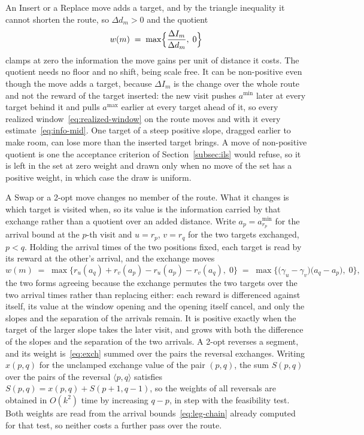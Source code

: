 An Insert or a Replace move adds a target, and by the triangle inequality it cannot shorten the route, so $\Delta d_m > 0$ and the quotient
\begin{equation}\label{eq:cand-weight}
    w(m) \;=\; \max\Bigl\{ \frac{\Delta I_m}{\Delta d_m},\; 0 \Bigr\}
\end{equation}
clamps at zero the information the move gains per unit of distance it costs. The quotient needs no floor and no shift, being scale free.
It can be non-positive even though the move adds a target, because $\Delta I_m$ is the change over
the whole route and not the reward of the target inserted: the new visit pushes $a^{\min}$ later
at every target behind it and pulls $a^{\max}$ earlier at every target ahead of it, so every realized
window~\eqref{eq:realized-window} on the route moves and with it every estimate~\eqref{eq:info-mid}.
One target of a steep positive slope, dragged earlier to make room, can lose more than the inserted target
brings. A move of non-positive quotient is one the acceptance criterion of Section~\ref{subsec:ils} would refuse,
so it is left in the set at zero weight and drawn only when no move of the set has a positive weight, in which case
the draw is uniform.

A Swap or a 2-opt move changes no member of the route. What it changes is which target is visited when, so its value is the information carried by that exchange rather than a quotient over an added distance. Write $a_p = a^{\min}_{r_p}$ for the arrival bound at the $p$-th visit and $u = r_p$, $v = r_q$ for the two targets exchanged, $p < q$. Holding the arrival times of the two positions fixed, each target is read by its reward at the other's arrival, and the exchange moves
\begin{equation}\label{eq:exch}
    w(m) \;=\; \max\bigl\{ r_u(a_q) + r_v(a_p) - r_u(a_p) - r_v(a_q),\; 0 \bigr\}
           \;=\; \max\bigl\{ \bigl( \gamma_u - \gamma_v \bigr)\bigl( a_q - a_p \bigr),\; 0 \bigr\} ,
\end{equation}
the two forms agreeing because the exchange permutes the two targets over the two arrival times rather than replacing either: each reward is differenced against itself, its value at the window opening and the opening itself cancel, and only the slopes and the separation of the arrivals remain. It is positive exactly when the target of the larger slope takes the later visit, and grows with both the difference of the slopes and the separation of the two arrivals. A 2-opt reverses a segment, and its weight is~\eqref{eq:exch} summed over the pairs the reversal exchanges. Writing $x(p, q)$ for the unclamped exchange value of the pair $(p, q)$, the sum $S(p, q)$ over the pairs of the reversal $\langle p, q \rangle$ satisfies $S(p, q) = x(p, q) + S(p+1, q-1)$, so the weights of all reversals are obtained in $O(k^2)$ time by increasing $q - p$, in step with the feasibility test. Both weights are read from the arrival bounds~\eqref{eq:leg-chain} already computed for that test, so neither costs a further pass over the route.

